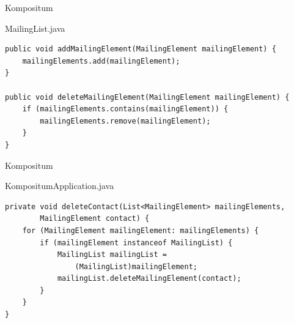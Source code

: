 \begin{frame}[fragile]{Kompositum}
	\begin{exampleblock}{MailingList.java}
        \begin{lstlisting}
public void addMailingElement(MailingElement mailingElement) {
    mailingElements.add(mailingElement);
}

public void deleteMailingElement(MailingElement mailingElement) {
    if (mailingElements.contains(mailingElement)) {
        mailingElements.remove(mailingElement);
    }
}
        \end{lstlisting}
 	\end{exampleblock}
\end{frame}

\begin{frame}[fragile]{Kompositum}
	\begin{exampleblock}{KompositumApplication.java}
        \begin{lstlisting}
private void deleteContact(List<MailingElement> mailingElements, 
        MailingElement contact) {
    for (MailingElement mailingElement: mailingElements) {
        if (mailingElement instanceof MailingList) {
            MailingList mailingList = 
                (MailingList)mailingElement;  
            mailingList.deleteMailingElement(contact);
        }
    }
}
        \end{lstlisting}
 	\end{exampleblock}
\end{frame}


